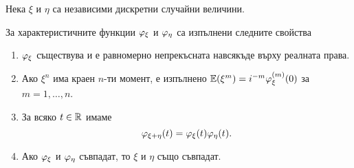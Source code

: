 \documentclass[numbers=endperiod, DIV=15, bibliography=totocnumbered]{scrartcl}
\begin{document}
\begin{theorem}\label{thm:char-props}
  Нека $\xi$ и $\eta$ са независими дискретни случайни величини.

  За характеристичните функции $\varphi_\xi$ и $\varphi_\eta$ са изпълнени следните свойства
  \begin{enumerate}
    \item $\varphi_\xi$ съществува и е равномерно непрекъсната навсякъде върху реалната права.

    \item Ако $\xi^n$ има краен $n$-ти момент, е изпълнено $\mathbb{E}(\xi^m) = i^{-m} \varphi_\xi^{(m)} (0)$ за $m = 1, \ldots, n$.

    \item За всяко $t \in \mathbb{R}$ имаме
    \begin{displaymath}
      \varphi_{\xi + \eta}(t) = \varphi_\xi(t) \varphi_\eta(t).
    \end{displaymath}

    \item Ако $\varphi_\xi$ и $\varphi_\eta$ съвпадат, то $\xi$ и $\eta$ също съвпадат.
  \end{enumerate}
\end{theorem}
\end{document}
